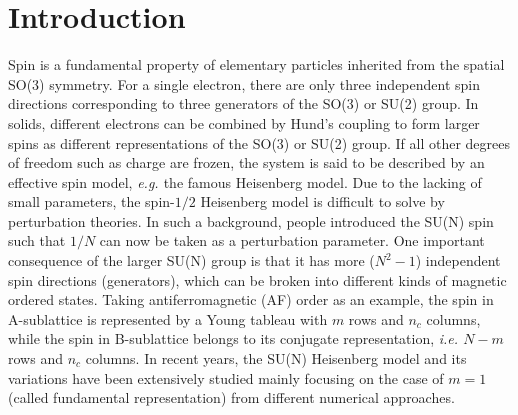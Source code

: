 \documentclass[aps,twocolumn,superscriptaddress]{revtex4-1}
\newcommand{\ie}{\textit{i.e.{ }}}
\newcommand{\eg}{\textit{e.g.{ }}}
\begin{document}
\section{Introduction}
Spin is a fundamental property of elementary particles inherited from the spatial SO(3) symmetry. For a single electron,
there are only three independent spin directions corresponding to three generators of the SO(3) or SU(2) group. In solids, different
electrons can be combined by Hund's coupling to form larger spins as different representations of the SO(3) or SU(2)
group. If all other degrees of freedom such as charge are frozen, the system is said to be described by an effective
spin model, \eg the famous Heisenberg model. Due to the lacking of small parameters, the spin-$1/2$ Heisenberg model is
difficult to solve by perturbation theories. In such a background, people introduced the SU(N) spin such that $1/N$ can
now be taken as a perturbation parameter.
\cite{affleck1985,affleck1988,*marston1989,arovas1988,read1989,*read1989a,*read1990} One important consequence of the
larger SU(N) group is that it has more ($N^2-1$) independent spin directions (generators), which can be broken into
different kinds of magnetic ordered states. Taking antiferromagnetic (AF) order as an example, the spin in A-sublattice
is represented by a Young tableau with $m$ rows and $n_c$ columns, while the spin in B-sublattice belongs to its
conjugate representation, \ie $N-m$ rows and $n_c$ columns. In recent years, the SU(N) Heisenberg model and its
variations have been extensively studied mainly focusing on the case of $m=1$ (called fundamental representation) from
different numerical approaches.
\cite{harada2003,buchta2007,kawashima2007,arovas2008,beach2009,lou2009,rachel2009,kaul2012,harada2013,nataf2014,okubo2015,suzuki2015,nataf2016}
\end{document}
